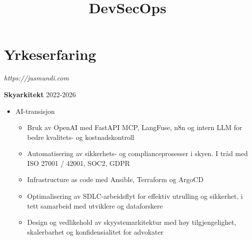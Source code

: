 \documentclass[11pt,a4paper]{moderncv}
\title{DevSecOps}
\begin{document}
\makecvtitle

\section{Yrkeserfaring}

{
\textit{https://jusmundi.com}
\bigskip

\textbf{Skyarkitekt} \hfill 2022-2026
	\begin{itemize}%
		\item AI-transisjon
			\begin{itemize}%
				\item Bruk av OpenAI med FastAPI MCP, LangFuse, n8n og intern LLM for bedre kvalitets- og kostnadskontroll
				\item Automatisering av sikkerhets- og complianceprosesser i skyen. I tråd med ISO 27001 / 42001, SOC2, GDPR
				\item Infrastructure as code med Ansible, Terraform og ArgoCD
				\item Optimalisering av SDLC-arbeidsflyt for effektiv utrulling og sikkerhet, i tett samarbeid med utviklere og dataforskere
				\item Design og vedlikehold av skyystemarkitektur med høy tilgjengelighet, skalerbarhet og konfidensialitet for advokater
			\end{itemize}
	\end{itemize}
}
\bigskip
{}
\end{document}
